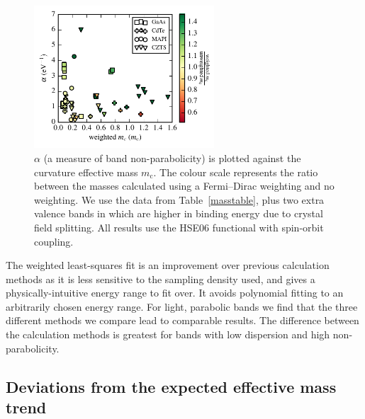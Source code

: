 \begin{figure}[tb]\centering
\includegraphics[width=0.6\textwidth]{./figures/ch4/mass_alpha_ratio.pdf}
\caption[Band non-parabolicity vs effective mass]{\label{mass_alpha_ratio}$\alpha$ (a measure of band non-parabolicity) is plotted against the curvature effective mass $m_\text{c}$. The colour scale represents the ratio between the masses calculated using a Fermi--Dirac weighting and no weighting. We use the data from Table\ \ref{masstable}, plus two extra valence bands in  which are higher in binding energy due to crystal field splitting. All results use the HSE06 functional with spin-orbit coupling.} 
\end{figure}

The weighted least-squares fit is an improvement over previous calculation methods as it is less sensitive to the sampling density used, and gives a physically-intuitive energy range to fit over. 
It avoids polynomial fitting to an arbitrarily chosen energy range. 
For light, parabolic bands we find that the three different methods we compare lead to comparable results.
The difference between the calculation methods is greatest for bands with low dispersion and high non-parabolicity.

\subsection{Deviations from the expected effective mass trend}

